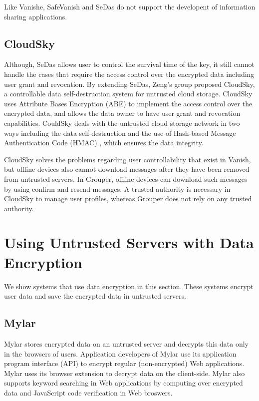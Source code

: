 \documentclass[a4paper,11pt]{report}
\begin{document}
Like Vanishe, SafeVanish and SeDas do not support the developent of information sharing applications.

\subsection{CloudSky}

Although, SeDas allows user to control the survival time of the key, it still cannot handle the cases that require the access control over the encrypted data including user grant and revocation.
By extending SeDas, Zeng's group proposed CloudSky\cite{zeng2015cloudsky}, a controllable data self-destruction system for untrusted cloud storage. 
CloudSky uses Attribute Bases Encryption (ABE) to implement the access control over the encrypted data, and allows the data owner to have user grant and revocation capabilities.
CouldSky deals with the untrusted cloud storage network in two ways including the data self-destruction and the use of Hash-based Message Authentication Code (HMAC) \cite{bellare1997hmac}, which ensures the data integrity.

CloudSky solves the problems regarding user controllability that exist in Vanish, but offline devices also cannot download messages after they have been removed from untrusted servers.
In Grouper, offline devices can download such messages by using confirm and resend messages.
A trusted authority is necessary in CloudSky to manage user profiles, whereas Grouper does not rely on any trusted authority.

\section{Using Untrusted Servers with Data Encryption}

We show systems that use data encryption in this section.
These systems encrypt user data and save the encrypted data in untrusted servers.

\subsection{Mylar}
Mylar\cite{popa2014building} stores encrypted data on an untrusted server and decrypts this data only in the browsers of users. 
Application developers of Mylar use its application program interface (API) to encrypt regular (non-encrypted) Web applications. 
Mylar uses its browser extension to decrypt data on the client-side. 
Mylar also supports keyword searching in Web applications by computing over encrypted data and JavaScript code verification in Web broswers.
\end{document}
